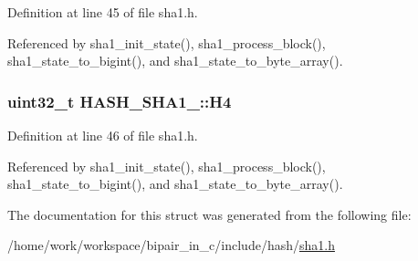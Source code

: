 Definition at line 45 of file sha1.\-h.



Referenced by sha1\-\_\-init\-\_\-state(), sha1\-\_\-process\-\_\-block(), sha1\-\_\-state\-\_\-to\-\_\-bigint(), and sha1\-\_\-state\-\_\-to\-\_\-byte\-\_\-array().

\hypertarget{structHASH__SHA1___ab66c6842b1d406e053a31f1370eefb25}{
\subsubsection[{H4}]{\setlength{\rightskip}{0pt plus 5cm}uint32\-\_\-t H\-A\-S\-H\-\_\-\-S\-H\-A1\-\_\-\-::\-H4}}\label{structHASH__SHA1___ab66c6842b1d406e053a31f1370eefb25}


Definition at line 46 of file sha1.\-h.



Referenced by sha1\-\_\-init\-\_\-state(), sha1\-\_\-process\-\_\-block(), sha1\-\_\-state\-\_\-to\-\_\-bigint(), and sha1\-\_\-state\-\_\-to\-\_\-byte\-\_\-array().



The documentation for this struct was generated from the following file\-:\begin{DoxyCompactItemize}
\item 
/home/work/workspace/bipair\-\_\-in\-\_\-c/include/hash/\hyperlink{sha1_8h}{sha1.\-h}\end{DoxyCompactItemize}

